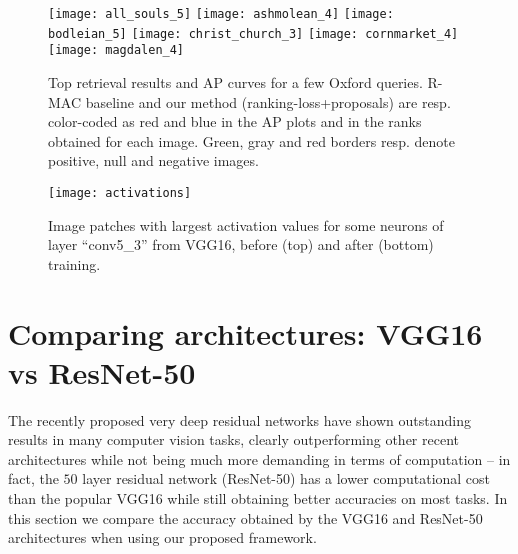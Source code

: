 \documentclass[runningheads]{llncs}
\begin{document}
 \begin{figure}[b!]
 \begin{centering}
\texttt{[image: all\_souls\_5]}
\texttt{[image: ashmolean\_4]}
\texttt{[image: bodleian\_5]}
\texttt{[image: christ\_church\_3]}
\texttt{[image: cornmarket\_4]}
\texttt{[image: magdalen\_4]}
 \par\end{centering}
 \caption{\label{fig:ox-qual}Top retrieval results and AP curves for a few Oxford queries. R-MAC
 baseline and our method (ranking-loss+proposals) are resp. color-coded as red and blue in the AP plots 
 and in the ranks obtained for each image.
 Green, gray and red borders resp. denote positive, null and negative images.}
 \vspace{-0.3cm}
 \end{figure}

 \begin{figure}[t!]
\centering
 \texttt{[image: activations]}
 \caption{\label{fig:activations} Image patches with largest activation values for some neurons of layer ``conv5\_3'' from VGG16, before (top) and after (bottom) training.}
 \end{figure}

\section{Comparing architectures: VGG16 vs ResNet-50}
The recently proposed very deep residual networks \cite{He2016} have shown outstanding results in many computer vision tasks, clearly outperforming other recent architectures while not being much more demanding in terms of computation -- in fact, the $50$ layer residual network (ResNet-50) has a lower computational cost than the popular VGG16 while still obtaining better accuracies on most tasks.
In this section we compare the accuracy obtained by the VGG16 and ResNet-50 architectures when using our proposed framework.
\end{document}
